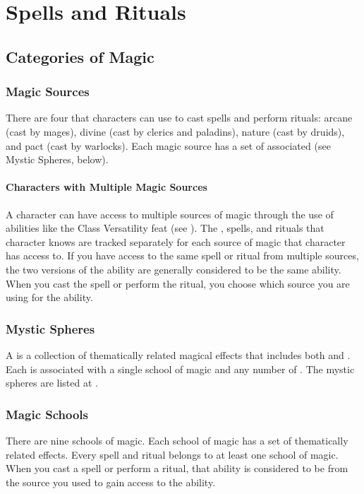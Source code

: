 \chapter{Spells and Rituals}\label{Spells and Rituals}

\section{Categories of Magic}

    \subsection{Magic Sources}
        There are four  that characters can use to cast spells and perform rituals: arcane (cast by mages), divine (cast by clerics and paladins), nature (cast by druids), and pact (cast by warlocks).
        Each magic source has a set of associated  (see Mystic Spheres, below).

        \subsubsection{Characters with Multiple Magic Sources}
            A character can have access to multiple sources of magic through the use of abilities like the Class Versatility feat (see ).
            The , spells, and rituals that character knows are tracked separately for each source of magic that character has access to.
            If you have access to the same spell or ritual from multiple sources, the two versions of the ability are generally considered to be the same ability.
            When you cast the spell or perform the ritual, you choose which source you are using for the ability.

    \subsection{Mystic Spheres}\label{Mystic Spheres}
        A  is a collection of thematically related magical effects that includes both  and .
        Each  is associated with a single school of magic and any number of .
        The mystic spheres are listed at .

    \subsection{Magic Schools}
        There are nine schools of magic.
        Each school of magic has a set of thematically related effects.
        Every spell and ritual belongs to at least one school of magic.
        When you cast a spell or perform a ritual, that ability is considered to be from the source you used to gain access to the ability.

